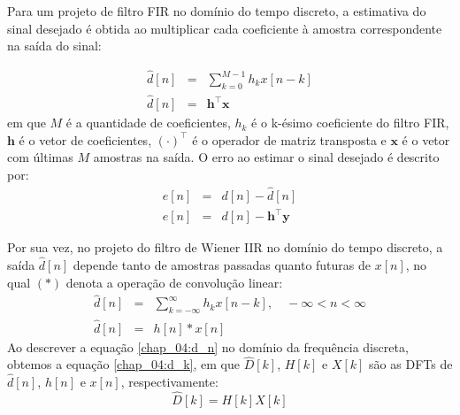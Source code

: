Para um projeto de filtro FIR no domínio do tempo discreto, a estimativa do
sinal desejado é obtida ao multiplicar cada coeficiente à amostra correspondente
na saída do sinal: 

\begin{eqnarray}
    \hat{d}[n] &=& \sum_{k=0}^{M-1}h_k x[n-k]\\
    \hat{d}[n] &=& \textbf{h}^\top \textbf{x}
    \end{eqnarray}
em que $M$ é a quantidade de coeficientes, $h_k$ é o k-ésimo coeficiente do
filtro FIR, $\textbf{h}$ é o vetor de coeficientes, $(\cdot) ^\top$ é o operador
de matriz transposta e $\mathbf{x}$ é o vetor com últimas $M$ amostras na saída.
O erro ao estimar o sinal desejado é descrito por:
\begin{eqnarray}
  \label{chap_04:error}  e[n] &=& d[n] - \hat{d}[n]\\
    e[n] &=& d[n] - \textbf{h}^\top \textbf{y}
\end{eqnarray}


Por sua vez, no projeto do filtro de Wiener IIR no domínio do tempo discreto, a
saída $\hat{d}[n]$ depende tanto de amostras passadas quanto futuras de $x[n]$,
no qual $(*)$ denota a operação de convolução linear:
\begin{eqnarray}
    \hat{d}[n] &=& \sum_{k=-\infty}^{\infty}h_k x[n-k], \quad -\infty < n < \infty\\
    \label{chap_04:d_n}\hat{d}[n] &=& h[n] \ast x[n]
\end{eqnarray}
Ao descrever a equação \ref{chap_04:d_n} no domínio da frequência discreta,
obtemos a equação \ref{chap_04:d_k}, em que $\hat{D}[k]$, $H[k]$ e
$X[k]$ são as DFTs de $\hat{d}[n]$, $h[n]$ e $x[n]$, respectivamente:
\begin{equation} \label{chap_04:d_k}
    \hat{D}[k] = H[k] X[k]
\end{equation}

